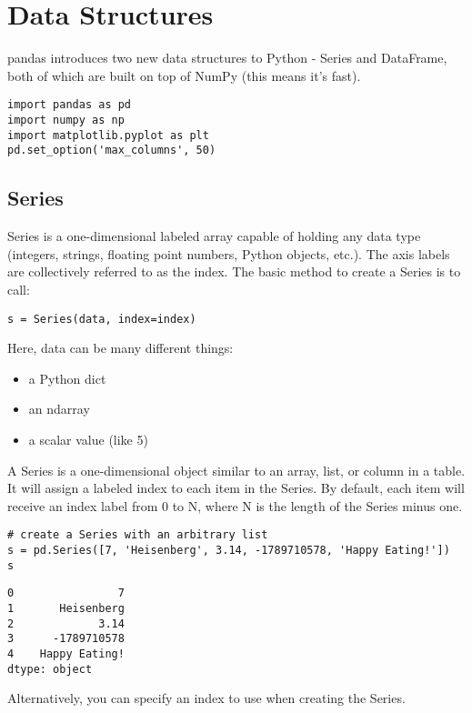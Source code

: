 \documentclass[main.tex]{subfiles}
\begin{document}
\section{Data Structures}

pandas introduces two new data structures to Python - Series and DataFrame, both of which are built on top of NumPy (this means it's fast).

\begin{framed}
\begin{verbatim}
import pandas as pd
import numpy as np
import matplotlib.pyplot as plt
pd.set_option('max_columns', 50)
\end{verbatim}
\end{framed}
\subsection{Series}

Series is a one-dimensional labeled array capable of holding any data type (integers, strings, floating point numbers, Python objects, etc.). The axis labels are collectively referred to as the index. The basic method to create a Series is to call:
 
\begin{framed}
\begin{verbatim}
s = Series(data, index=index)
\end{verbatim}
\end{framed} 
Here, data can be many different things:
 
\begin{itemize}
\item a Python dict
\item an ndarray
\item a scalar value (like 5)
\end{itemize}

A Series is a one-dimensional object similar to an array, list, or column in a table. It will assign a labeled index to each item in the Series. By default, each item will receive an index label from 0 to N, where N is the length of the Series minus one.

\begin{framed}
\begin{verbatim}
# create a Series with an arbitrary list
s = pd.Series([7, 'Heisenberg', 3.14, -1789710578, 'Happy Eating!'])
s
\end{verbatim}
\end{framed}
\begin{verbatim}
0                7
1       Heisenberg
2             3.14
3      -1789710578
4    Happy Eating!
dtype: object
\end{verbatim}
Alternatively, you can specify an index to use when creating the Series.
\end{document}
